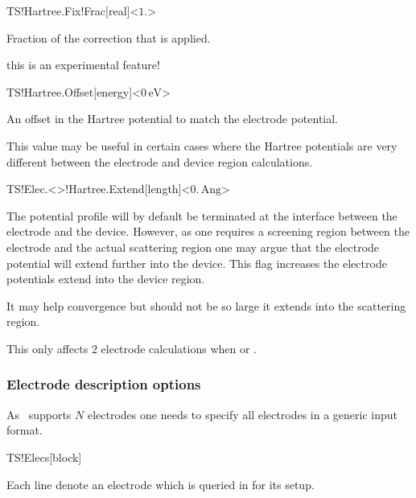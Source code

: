 \begin{fdfentry}{TS!Hartree.Fix!Frac}[real]<$1.$>

  Fraction of the correction that is applied.

  \note this is an experimental feature!

\end{fdfentry}

\begin{fdfentry}{TS!Hartree.Offset}[energy]<$0\,\mathrm{eV}$>

  An offset in the Hartree potential to match the electrode potential.

  This value may be useful in certain cases where the Hartree
  potentials are very different between the electrode and device
  region calculations.

\end{fdfentry}


\begin{fdfentry}{TS!Elec.<>!Hartree.Extend}[length]<$0.\,\mathrm{Ang}$>

  The potential profile will by default be terminated at the interface
  between the electrode and the device. However, as one requires a
  screening region between the electrode and the actual scattering
  region one may argue that the electrode potential will extend
  further into the device.
  This flag increases the electrode potentials extend into the device
  region.

  It may help convergence but should not be so large it extends into
  the scattering region.

  \note This only affects $2$ electrode calculations when
   or .
  
\end{fdfentry}


\subsubsection{Electrode description options}

As \tsiesta\ supports $N$ electrodes one needs to specify all
electrodes in a generic input format.

\begin{fdfentry}{TS!Elecs}[block]

  Each line denote an electrode which is queried in 
  for its setup.
  
\end{fdfentry}


